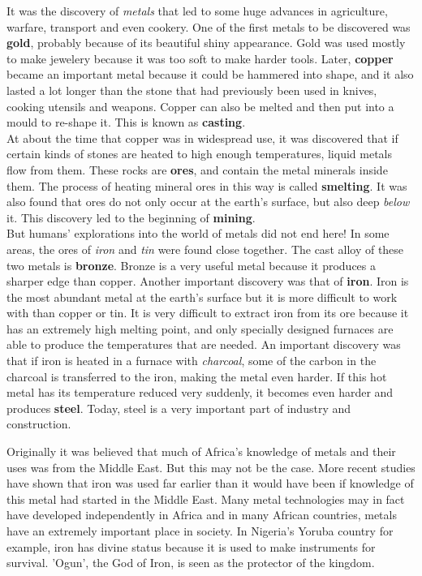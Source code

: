 It was the discovery of \textit{metals} that led to some huge advances in agriculture, warfare, transport and even cookery. One of the first metals to be discovered was \textbf{gold}, probably because of its beautiful shiny appearance. Gold was used mostly to make jewelery because it was too soft to make harder tools. Later, \textbf{copper} became an important metal because it could be hammered into shape, and it also lasted a lot longer than the stone that had previously been used in knives, cooking utensils and weapons. Copper can also be melted and then put into a mould to re-shape it. This is known as \textbf{casting}. \\

At about the time that copper was in widespread use, it was discovered that if certain kinds of stones are heated to high enough temperatures, liquid metals flow from them. These rocks are \textbf{ores}, and contain the metal minerals inside them. The process of heating mineral ores in this way is called \textbf{smelting}. It was also found that ores do not only occur at the earth's surface, but also deep \textit{below} it. This discovery led to the beginning of \textbf{mining}.\\

But humans' explorations into the world of metals did not end here! In some areas, the ores of \textit{iron} and \textit{tin} were found close together. The cast alloy of these two metals is \textbf{bronze}. Bronze is a very useful metal because it produces a sharper edge than copper. Another important discovery was that of \textbf{iron}. Iron is the most abundant metal at the earth's surface but it is more difficult to work with than copper or tin. It is very difficult to extract iron from its ore because it has an extremely high melting point, and only specially designed furnaces are able to produce the temperatures that are needed. An important discovery was that if iron is heated in a furnace with \textit{charcoal}, some of the carbon in the charcoal is transferred to the iron, making the metal even harder. If this hot metal has its temperature reduced very suddenly, it becomes even harder and produces \textbf{steel}. Today, steel is a very important part of industry and construction.\\


\begin{IFact}{
Originally it was believed that much of Africa's knowledge of metals and their uses was from the Middle East. But this may not be the case. More recent studies have shown that iron was used far earlier than it would have been if knowledge of this metal had started in the Middle East. Many metal technologies may in fact have developed independently in Africa and in many African countries, metals have an extremely important place in society. In Nigeria's Yoruba country for example, iron has divine status because it is used to make instruments for survival. 'Ogun', the God of Iron, is seen as the protector of the kingdom.
}
\end{IFact}




